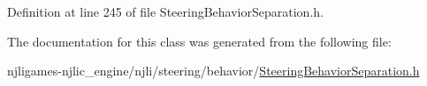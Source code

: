 Definition at line 245 of file Steering\+Behavior\+Separation.\+h.



The documentation for this class was generated from the following file\+:\begin{DoxyCompactItemize}
\item 
njligames-\/njlic\+\_\+engine/njli/steering/behavior/\mbox{\hyperlink{_steering_behavior_separation_8h}{Steering\+Behavior\+Separation.\+h}}\end{DoxyCompactItemize}
